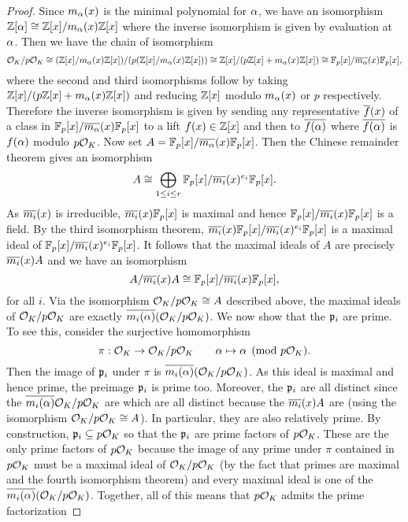     \begin{proof}
      Since $m_{\alpha}(x)$ is the minimal polynomial for $\alpha$, we have an isomorphism $\mathbb{Z}[\alpha] \cong \mathbb{Z}[x]/m_{\alpha}(x)\mathbb{Z}[x]$ where the inverse isomorphism is given by evaluation at $\alpha$. Then we have the chain of isomorphism
      \[
        \mathcal{O}_{K}/p\mathcal{O}_{K} \cong (\mathbb{Z}[x]/m_{\alpha}(x)\mathbb{Z}[x])/(p(\mathbb{Z}[x]/m_{\alpha}(x)\mathbb{Z}[x])) \cong \mathbb{Z}[x]/(p\mathbb{Z}[x]+m_{\alpha}(x)\mathbb{Z}[x]) \cong \mathbb{F}_{p}[x]/\overline{m_{\alpha}}(x)\mathbb{F}_{p}[x],
      \]
      where the second and third isomorphisms follow by taking $\mathbb{Z}[x]/(p\mathbb{Z}[x]+m_{\alpha}(x)\mathbb{Z}[x])$ and reducing $\mathbb{Z}[x]$ modulo $m_{\alpha}(x)$ or $p$ respectively. Therefore the inverse isomorphism is given by sending any representative $\overline{f}(x)$ of a class in $\mathbb{F}_{p}[x]/\overline{m_{\alpha}}(x)\mathbb{F}_{p}[x]$ to a lift $f(x) \in \mathbb{Z}[x]$ and then to $\overline{f(\alpha)}$ where $\overline{f(\alpha)}$ is $f(\alpha)$ modulo $p\mathcal{O}_{K}$. Now set $A = \mathbb{F}_{p}[x]/\overline{m_{\alpha}}(x)\mathbb{F}_{p}[x]$. Then the Chinese remainder theorem gives an isomorphism
      \[
        A \cong \bigoplus_{1 \le i \le r}\mathbb{F}_{p}[x]/\overline{m_{i}}(x)^{e_{i}}\mathbb{F}_{p}[x].
      \]
      As $\overline{m_{i}}(x)$ is irreducible, $\overline{m_{i}}(x)\mathbb{F}_{p}[x]$ is maximal and hence $\mathbb{F}_{p}[x]/\overline{m_{i}}(x)\mathbb{F}_{p}[x]$ is a field. By the third isomorphism theorem, $\overline{m_{i}}(x)\mathbb{F}_{p}[x]/\overline{m_{i}}(x)^{e_{i}}\mathbb{F}_{p}[x]$ is a maximal ideal of $\mathbb{F}_{p}[x]/\overline{m_{i}}(x)^{e_{i}}\mathbb{F}_{p}[x]$. It follows that the maximal ideals of $A$ are precisely $\overline{m_{i}}(x)A$ and we have an isomorphism
      \[
        A/\overline{m_{i}}(x)A \cong \mathbb{F}_{p}[x]/\overline{m_{i}}(x)\mathbb{F}_{p}[x],
      \]
      for all $i$. Via the isomorphism $\mathcal{O}_{K}/p\mathcal{O}_{K} \cong A$ described above, the maximal ideals of $\mathcal{O}_{K}/p\mathcal{O}_{K}$ are exactly $\overline{m_{i}(\alpha)}(\mathcal{O}_{K}/p\mathcal{O}_{K})$. We now show that the $\mathfrak{p}_{i}$ are prime. To see this, consider the surjective homomorphism
      \[
        \pi:\mathcal{O}_{K} \to \mathcal{O}_{K}/p\mathcal{O}_{K} \qquad \alpha \mapsto \alpha \pmod{p\mathcal{O}_{K}}.
      \]
      Then the image of $\mathfrak{p}_{i}$ under $\pi$ is $\overline{m_{i}(\alpha)}(\mathcal{O}_{K}/p\mathcal{O}_{K})$. As this ideal is maximal and hence prime, the preimage $\mathfrak{p}_{i}$ is prime too. Moreover, the $\mathfrak{p}_{i}$ are all distinct since the $\overline{m_{i}(\alpha)}\mathcal{O}_{K}/p\mathcal{O}_{K}$ are which are all distinct because the $\overline{m_{i}}(x)A$ are (using the isomorphism $\mathcal{O}_{K}/p\mathcal{O}_{K} \cong A$). In particular, they are also relatively prime. By construction, $\mathfrak{p}_{i} \subseteq p\mathcal{O}_{K}$ so that the $\mathfrak{p}_{i}$ are prime factors of $p\mathcal{O}_{K}$. These are the only prime factors of $p\mathcal{O}_{K}$ because the image of any prime under $\pi$ contained in $p\mathcal{O}_{K}$ must be a maximal ideal of $\mathcal{O}_{K}/p\mathcal{O}_{K}$ (by the fact that primes are maximal and the fourth isomorphism theorem) and every maximal ideal is one of the $\overline{m_{i}(\alpha)}(\mathcal{O}_{K}/p\mathcal{O}_{K})$. Together, all of this means that $p\mathcal{O}_{K}$ admits the prime factorization

\end{proof}
